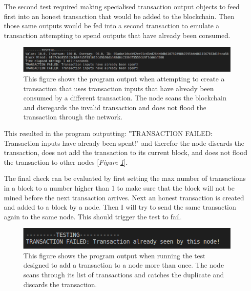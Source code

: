 \documentclass{l4proj}
\begin{document}
The second test required making specialised transaction output objects to feed first into an honest transaction that
would be added to the blockchain. Then those same outputs would be fed into a second transaction to emulate a
transaction attempting to spend outputs that have already been consumed.

\begin{figure}[!ht]
    \centering
    \includegraphics[width=1\linewidth]{images/inputsspent.png}    
    \caption
    {
        This figure shows the program output when attempting to create a transaction that uses transaction inputs
        that have already been consumed by a different transaction. The node scans the blockchain and disregards the
        invalid transaction and does not flood the transaction through the network.
    }
    \label{fig:inputsspent}
\end{figure}

This resulted in the program outputting: "TRANSACTION FAILED: Transaction inputs have already been spent!" and
therefor the node discards the transaction, does not add the transaction to its current block, and does not flood
the transaction to other nodes [\textit{Figure \ref{fig:inputsspent}}].

The final check can be evaluated by first setting the max number of transactions in a block to a number higher than
1 to make sure that the block will not be mined before the next transaction arrives. Next an honest transaction is 
created and added to a block by a node. Then I will try to send the same transaction again to the same node. This
should trigger the test to fail.

\begin{figure}[!ht]
    \centering
    \includegraphics[width=1\linewidth]{images/seenbynode.png}    
    \caption
    {
        This figure shows the program output when running the test designed to add a transaction to a node more than
        once. The node scans through its list of transactions and catches the duplicate and discards the transaction.
    }
    \label{fig:seenbynode} 
\end{figure}
\end{document}

